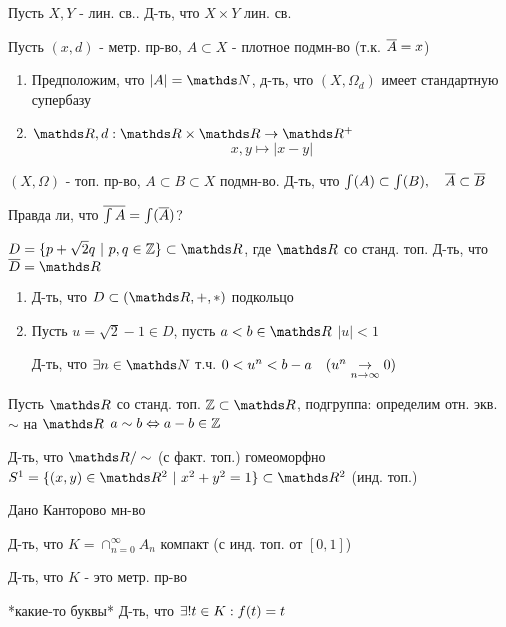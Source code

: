 \documentclass[geometry.tex]{subfiles}
\begin{document}
  \begin{task}
      Пусть $X,Y$ - лин. св.. Д-ть, что $X \times Y$ лин. св.
  \end{task}

  \begin{task}
      Пусть $(x, d)$ - метр. пр-во, $A \subset X$ - плотное подмн-во (т.к. $\overline{A} = x$)
      \begin{enumerate}
        \item Предположим, что $|A| = \N$, д-ть, что $(X, \Omega_d)$ имеет стандартную супербазу
        \item $\R, d: \R \times \R \ra \R^+$
        \[x, y \mapsto |x - y|\]
      \end{enumerate}
  \end{task}

  \begin{task}
      $(X, \Omega)$ - топ. пр-во, $A \subset B \subset X$ подмн-во. Д-ть, что $\int(A) \subset \int(B), \quad \overline{A} \subset \overline{B}$

      Правда ли, что $\overline{\int A} = \int(\overline{A})$?
  \end{task}

  \begin{task}
      $D = \{p + \sqrt{2}q \ |\ p,q \in \Z\} \subset \R$, где $\R$ со станд. топ. Д-ть, что $\ol{D} = \R$
      \begin{enumerate}
        \item Д-ть, что $D \subset (\R, +, *)$ подкольцо
        \item Пусть $u = \sqrt{2} - 1 \in D$, пусть $a < b \in \R$ $|u| < 1$

        Д-ть, что $\e n \in \N$ т.ч. $0 < u^n < b - a \quad (u^n \underset{n \rightarrow \infty}{\rightarrow} 0)$
      \end{enumerate}
  \end{task}

  \begin{task}
      Пусть $\R$ со станд. топ. $\Z \subset \R$, подгруппа: определим отн. экв. $\sim$ на $\R$ $a \sim b \Leftrightarrow a - b \in \mathbb{Z}$

      Д-ть, что $\R/\sim$ (с факт. топ.) гомеоморфно $S^1 = \{(x,y) \in \R^2 \ |\ x^2 + y^2 = 1\} \subset \R^2$ (инд. топ.)
  \end{task}

  \begin{task}
      Дано Канторово мн-во

      Д-ть, что $K = \cap_{n = 0}^{\infty} A_n$ компакт (с инд. топ. от $[0,1]$)

      Д-ть, что $K$ - это метр. пр-во
  \end{task}

  \begin{task}
      *какие-то буквы*
      Д-ть, что $\exists! t \in K: f(t) = t$
  \end{task}
\end{document}
